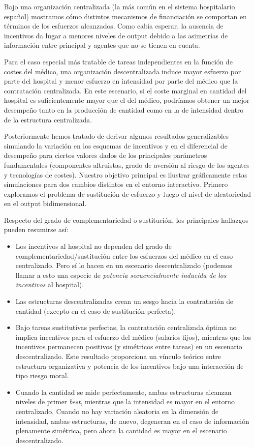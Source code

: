 ﻿\documentclass[12pt,letterpaper]{article}
\begin{document}
Bajo una organización centralizada (la más común en el sistema hospitalario español) mostramos cómo distintos mecanismos de financiación se comportan en términos de los esfuerzos alcanzados. Como cabía esperar, la ausencia de incentivos da lugar a menores niveles de output debido a las asimetrías de información entre principal y agentes que no se tienen en cuenta.

Para el caso especial más tratable de tareas independientes en la función de costes del médico, una organización descentralizada induce mayor esfuerzo por parte del hospital y menor esfuerzo en intensidad por parte del médico que la contratación centralizada. En este escenario, si el coste marginal en cantidad del hospital es suficientemente mayor que el del médico, podríamos obtener un mejor desempeño tanto en la producción de cantidad como en la de intensidad dentro de la estructura centralizada.

Posteriormente hemos tratado de derivar algunos resultados generalizables simulando la variación en los esquemas de incentivos y en el diferencial de desempeño para ciertos valores dados de los principales parámetros fundamentales (componentes altruistas, grado de aversión al riesgo de los agentes y tecnologías de costes). Nuestro objetivo principal es ilustrar gráficamente estas simulaciones para dos cambios distintos en el entorno interactivo. Primero exploramos el problema de sustitución de esfuerzo y luego el nivel de aleatoriedad en el output bidimensional.

Respecto del grado de complementariedad o sustitución, los principales hallazgos pueden resumirse así:

\begin{itemize}
  \item Los incentivos al hospital no dependen del grado de complementariedad/sustitución entre los esfuerzos del médico en el caso centralizado. Pero sí lo hacen en un escenario descentralizado (podemos llamar a esto una especie de \emph{potencia secuencialmente inducida de los incentivos} al hospital).
  \item Las estructuras descentralizadas crean un sesgo hacia la contratación de cantidad (excepto en el caso de sustitución perfecta).
  \item Bajo tareas sustitutivas perfectas, la contratación centralizada óptima no implica incentivos para el esfuerzo del médico (salarios fijos), mientras que los incentivos permanecen positivos (y simétricos entre tareas) en un escenario descentralizado. Este resultado proporciona un vínculo teórico entre estructura organizativa y potencia de los incentivos bajo una interacción de tipo riesgo moral.
  \item Cuando la cantidad se mide perfectamente, ambas estructuras alcanzan niveles de primer \emph{best}, mientras que la intensidad es mayor en el entorno centralizado. Cuando no hay variación aleatoria en la dimensión de intensidad, ambas estructuras, de nuevo, degeneran en el caso de información plenamente simétrica, pero ahora la cantidad es mayor en el escenario descentralizado.
\end{itemize}
\end{document}
